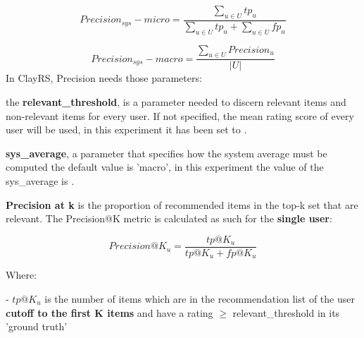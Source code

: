 \documentclass[12pt, a4paper]{article}
\begin{document}
    \[
    Precision_{sys} - micro = \frac{\sum_{u \in U} tp_u}{\sum_{u \in U} tp_u + \sum_{u \in U} fp_u}
    \]


    \[
    Precision_{sys} - macro = \frac{\sum_{u \in U} Precision_u}{|U|}
    \]
In ClayRS, Precision needs those parameters:

the \textbf{relevant\_threshold}, is a parameter needed to discern relevant items and non-relevant items for every user.
If not specified, the mean rating score of every user will be used, in this experiment it has been set to
\textbf{}.

\textbf{sys\_average}, a parameter that specifies how the system average must be computed the default value is 'macro',
in this experiment the value of the sys\_average is \textbf{}.





\textbf{Precision at k} is the proportion of recommended items in the top-k set that are relevant.
 The Precision@K metric is calculated as such for the \textbf{single user}:

    \[
    Precision@K_u = \frac{tp@K_u}{tp@K_u + fp@K_u}
    \]

    Where:

    - $tp@K_u$ is the number of items which are in the recommendation list  of the user
      \textbf{cutoff to the first K items} and have a rating $\geq$ relevant\_threshold in its 'ground truth'
\end{document}
